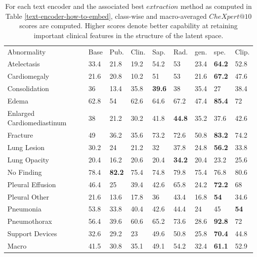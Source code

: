 \documentclass{article}
\begin{document}
\begin{table}
  \caption{For each text encoder and the associated best $extraction$ method as computed in Table \ref{text-encoder-how-to-embed}, class-wise and macro-averaged $CheXpert@10$ scores are computed. Higher scores denote better capability at retaining important clinical features in the structure of the latent space.}
  \label{text-encoder-cluster-impressions}
  \centering
  \begin{tabular}{lllllllll}
    \toprule
    Abnormality     
    & Base
    & Pub.
    & Clin.
    & Sap.
    & Rad.
    & gen.
    & spe.
    & Clip.\\
    Atelectasis
    & 33.4
    & 21.8
    & 19.2
    & 54.2
    & 53
    & 23.4
    & \textbf{64.2}
    & 52.8\\
    Cardiomegaly
    & 21.6
    & 20.8
    & 10.2
    & 51
    & 53
    & 21.6
    & \textbf{67.2}
    & 47.6\\
    Consolidation
    & 36
    & 13.4
    & 35.8
    & \textbf{39.6}
    & 38
    & 35.4
    & 27
    & 38.4\\
    Edema
    & 62.8
    & 54
    & 62.6
    & 64.6
    & 67.2
    & 47.4
    & \textbf{85.4}
    & 72\\
    Enlarged Cardiomediastinum
    & 38
    & 21.2
    & 30.2
    & 41.8
    & \textbf{44.8}
    & 35.2
    & 37.6
    & 42.6\\
    Fracture
    & 49
    & 36.2
    & 35.6
    & 73.2
    & 72.6
    & 50.8
    & \textbf{83.2}
    & 74.2\\
    Lung Lesion
    & 30.2
    & 24
    & 21.2
    & 32
    & 37.8
    & 24.8
    & \textbf{56.2}
    & 33.8\\
    Lung Opacity
    & 20.4
    & 16.2
    & 20.6
    & 20.4
    & \textbf{34.2}
    & 20.4
    & 23.2
    & 25.6\\
    No Finding
    & 78.4
    & \textbf{82.2}
    & 75.4
    & 74.8
    & 79.8
    & 75.4
    & 76.8
    & 80.6\\
    Pleural Effusion
    & 46.4
    & 25
    & 39.4
    & 42.6
    & 65.8
    & 24.2
    & \textbf{72.2}
    & 68\\
    Pleural Other
    & 21.6
    & 13.6
    & 17.8
    & 36
    & 43.4
    & 16.8
    & \textbf{54}
    & 34.6\\
    Pneumonia
    & 53.8
    & 33.8
    & 40.4
    & 42.6
    & 44.4
    & 24
    & 45
    & \textbf{54}\\
    Pneumothorax
    & 56.4
    & 39.6
    & 60.6
    & 65.2
    & 73.6
    & 28.6
    & \textbf{92.8}
    & 72\\
    Support Devices
    & 32.6
    & 29.2
    & 23
    & 49.6
    & 50.8
    & 25.8
    & \textbf{70.4}
    & 44.8\\
    Macro
    & 41.5
    & 30.8
    & 35.1
    & 49.1
    & 54.2
    & 32.4
    & \textbf{61.1}
    & 52.9\\
    \bottomrule
  \end{tabular}
\end{table}
\end{document}
